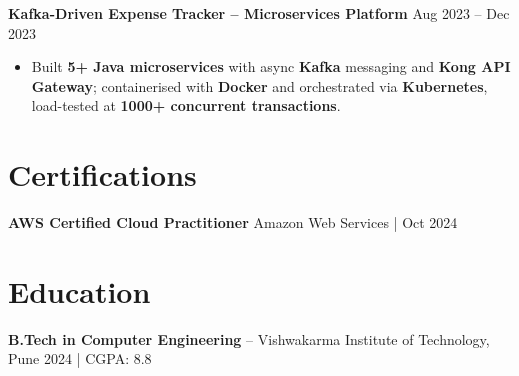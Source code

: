 \documentclass[letterpaper,10pt]{article}
\begin{document}
\textbf{Kafka-Driven Expense Tracker -- Microservices Platform} \hfill Aug 2023 -- Dec 2023
\begin{itemize}[leftmargin=*]
    \item Built \textbf{5+ Java microservices} with async \textbf{Kafka} messaging and \textbf{Kong API Gateway}; containerised with \textbf{Docker} and orchestrated via \textbf{Kubernetes}, load-tested at \textbf{1000+ concurrent transactions}.
\end{itemize}

\section*{Certifications}
\textbf{AWS Certified Cloud Practitioner} \hfill Amazon Web Services \;|\; Oct 2024

\section*{Education}
\textbf{B.Tech in Computer Engineering} -- Vishwakarma Institute of Technology, Pune \hfill 2024 \;|\; CGPA: 8.8
\end{document}
